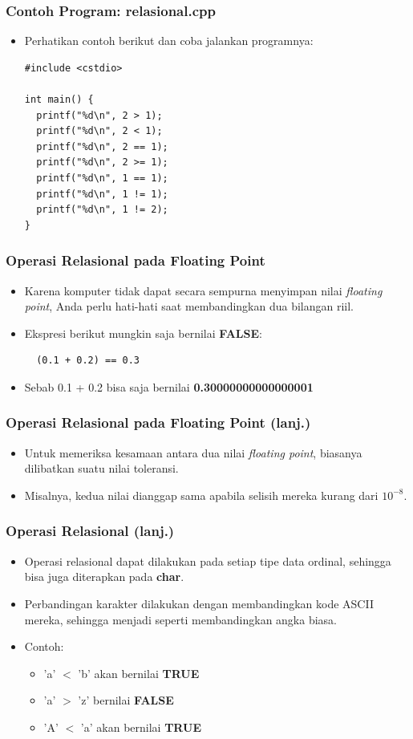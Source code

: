 \begin{frame}[fragile]
\frametitle{Contoh Program: relasional.cpp}
\begin{itemize}
  \item Perhatikan contoh berikut dan coba jalankan programnya:
\begin{lstlisting}
#include <cstdio>

int main() {
  printf("%d\n", 2 > 1);
  printf("%d\n", 2 < 1);
  printf("%d\n", 2 == 1);
  printf("%d\n", 2 >= 1);
  printf("%d\n", 1 == 1);
  printf("%d\n", 1 != 1);
  printf("%d\n", 1 != 2);
}
\end{lstlisting}
\end{itemize}
\end{frame}

\begin{frame}[fragile]
\frametitle{Operasi Relasional pada Floating Point}
\begin{itemize}
  \item Karena komputer tidak dapat secara sempurna menyimpan nilai \textit{floating point}, Anda perlu hati-hati saat membandingkan dua bilangan riil.
  \item Ekspresi berikut mungkin saja bernilai \textbf{FALSE}:
  \begin{lstlisting}
  (0.1 + 0.2) == 0.3
  \end{lstlisting}
  \item Sebab 0.1 + 0.2 bisa saja bernilai \textbf{0.30000000000000001}
\end{itemize}
\end{frame}

\begin{frame}
\frametitle{Operasi Relasional pada Floating Point (lanj.)}
\begin{itemize}
  \item Untuk memeriksa kesamaan antara dua nilai \textit{floating point}, biasanya dilibatkan suatu nilai toleransi.
  \item Misalnya, kedua nilai dianggap sama apabila selisih mereka kurang dari $10^{-8}$.
\end{itemize}
\end{frame}

\begin{frame}
\frametitle{Operasi Relasional (lanj.)}
\begin{itemize}
  \item Operasi relasional dapat dilakukan pada setiap tipe data ordinal, sehingga bisa juga diterapkan pada \textbf{char}.
  \item Perbandingan karakter dilakukan dengan membandingkan kode ASCII mereka, sehingga menjadi seperti membandingkan angka biasa.
  \item Contoh:
  \begin{itemize}
    \item 'a' $<$ 'b' akan bernilai \textbf{TRUE}
    \item 'a' $>$ 'z' bernilai \textbf{FALSE}
    \item 'A' $<$ 'a' akan bernilai \textbf{TRUE}
  \end{itemize}
\end{itemize}
\end{frame}

